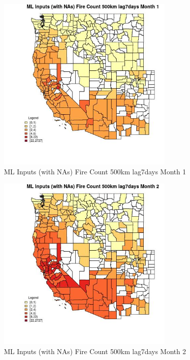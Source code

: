 \begin{figure} 
\centering  
\includegraphics[width=0.77\textwidth]{Code_Outputs/Report_ML_input_PM25_Step4_part_f_de_duplicated_aveswNAs_CountyFire_Count_500km_lag7daysmedianMonth1.jpg} 
\caption{\label{fig:Report_ML_input_PM25_Step4_part_f_de_duplicated_aveswNAsCountyFire_Count_500km_lag7daysmedianMonth1}ML Inputs (with NAs) Fire Count 500km lag7days Month 1} 
\end{figure} 
 

\begin{figure} 
\centering  
\includegraphics[width=0.77\textwidth]{Code_Outputs/Report_ML_input_PM25_Step4_part_f_de_duplicated_aveswNAs_CountyFire_Count_500km_lag7daysmedianMonth2.jpg} 
\caption{\label{fig:Report_ML_input_PM25_Step4_part_f_de_duplicated_aveswNAsCountyFire_Count_500km_lag7daysmedianMonth2}ML Inputs (with NAs) Fire Count 500km lag7days Month 2} 
\end{figure} 
 

